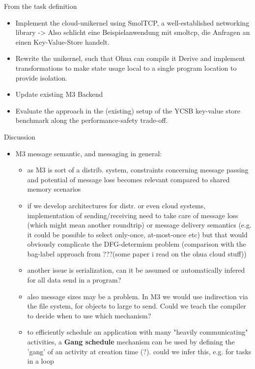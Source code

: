 From the task definition
\begin{itemize}
    \item Implement the cloud-unikernel using SmolTCP, a well-established networking library -> Also schlicht eine Beispielanwendung mit smoltcp, die Anfragen an einen Key-Value-Store handelt. 
    \item Rewrite the unikernel, such that Ohua can compile it Derive and implement transformations to make state usage local to a single program location to provide isolation.
    \item Update existing M3 Backend
    \item Evaluate the approach in the (existing) setup of the YCSB key-value store benchmark along the performance-safety trade-off. 
\end{itemize}


Discussion
\begin{itemize}
    \item M3 message semantic, and messaging in general:
    \begin{itemize}
        \item as M3 is sort of a distrib. system, constraints concerning message passing and potential of message loss becomes relevant compared to shared memory scenarios
        \item if we develop architectures for distr. or even cloud systems, implementation of sending/receiving need to take care of message loss (which might mean another roundtrip) or message delivery semantics (e.g. it could be possible to select only-once, at-most-once etc) but that would obviously complicate the DFG-determism problem 
        (comparison with the bag-label approach from ???(some paper i read on the ohua cloud stuff))
        \item another issue is serialization, can it be assumed or automatically infered for all data send in a program?
        \item also message sizes may be a problem. In M3 we would use indirection via the file system, for objects to large to send. Could we teach the compiler to decide when to use which mechanism?
        \item to efficiently schedule an application with many "heavily communicating" activities, a \textbf{Gang schedule} mechanism can be used  by defining the 'gang' of an activity at creation time (?). \means could we infer this, e.g. for tasks in a loop
    \end{itemize}
\end{itemize}




